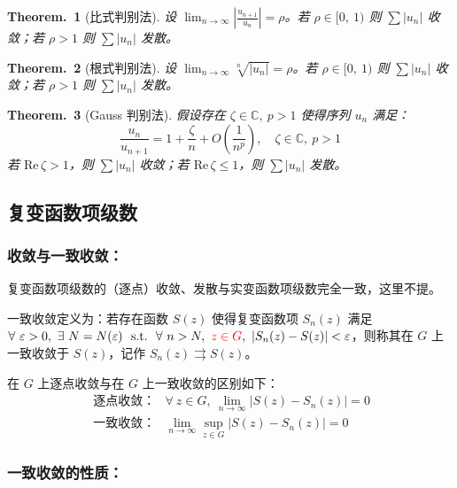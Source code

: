 \documentclass[UTF8]{report}
\def\Re{\mathrm{Re\,}}
\def\C{\mathbb{C}}
\theoremstyle{MyLineTheoremStyle} %
\newtheorem{LineTheorem}{Theorem.\,}
\theoremstyle{MyBlockTheoremStyle} %
\theoremstyle{MySubsubsectionStyle} %
\begin{document}
\begin{LineTheorem}[比式判别法]\label{比式判别法}
    设 $\displaystyle \lim_{n \to \infty} \left| \frac{u_{n+1}}{u_n} \right|  = \rho$。若 $\rho \in [0,\ 1)$ 则 $\sum | u_n |$ 收敛；若 $\rho > 1$ 则 $\sum | u_n |$ 发散。
\end{LineTheorem}

\begin{LineTheorem}[根式判别法]\label{根式判别法}
    设 $\displaystyle \lim_{n \to \infty} \sqrt[n]{| u_n |}  = \rho$。若 $\rho \in [0,\ 1)$ 则 $\sum | u_n |$ 收敛；若 $\rho > 1$ 则 $\sum | u_n |$ 发散。
\end{LineTheorem}

\begin{LineTheorem}[Gauss 判别法]\label{Gauss 判别法}
假设存在 $\zeta \in \C, \ p > 1$ 使得序列 $u_n$ 满足：
\begin{equation}
    \frac{u_n}{u_{n+1}} = 1 + \frac{\zeta}{n} + O\left( \frac{1}{n^p} \right),\quad \zeta \in \C, \ p > 1
\end{equation}
若 $\Re \zeta > 1$，则 $\sum | u_n |$ 收敛；若 $\Re \zeta \leqslant 1$，则 $\sum | u_n |$ 发散。
\end{LineTheorem}

\subsection{复变函数项级数}


\subsubsection{收敛与一致收敛：}
复变函数项级数的（逐点）收敛、发散与实变函数项级数完全一致，这里不提。

一致收敛定义为：若存在函数 $S(z)$ 使得复变函数项 $S_n(z)$ 满足 $\forall\ \varepsilon > 0,\ \exists\ N = N(\varepsilon)\ \ \text{s.t.}\ \ \forall\ n > N,\ {\color{red} z \in G},\ | S_n(z) - S(z) | < \varepsilon$，则称其在 $G$ 上一致收敛于 $S(z)$，记作 $S_n(z) \rightrightarrows S(z) $。

在 $G$ 上逐点收敛与在 $G$ 上一致收敛的区别如下：
\begin{align}
\ \text{逐点收敛：}& \forall\ z \in G,\ \lim_{n \to \infty} \left| S(z) -  S_n(z)\right| = 0
\\
\ \text{一致收敛：}& \lim_{n \to \infty} \sup_{z \in G} \left| S(z) -  S_n(z)\right| = 0
\end{align}

\subsubsection{一致收敛的性质：}
\end{document}
